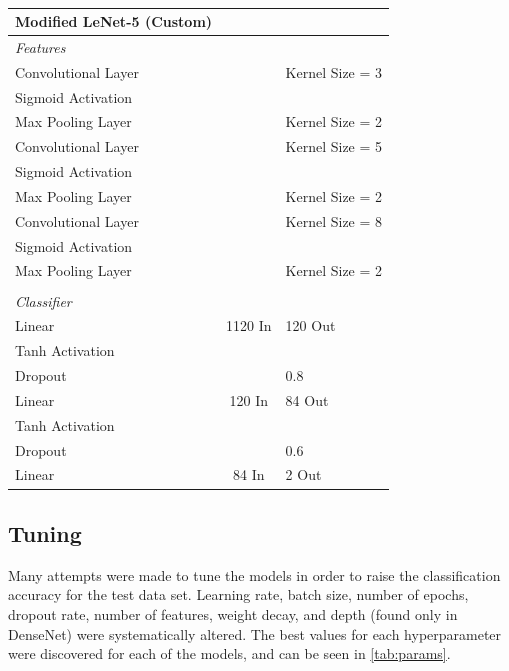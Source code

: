 \documentclass[manuscript,screen,review]{acmart}
\begin{document}
\begin{table}[h!]
\caption{}
  \label{tab:custom}
  \begin{tabular}{lcl}
    \textbf{Modified LeNet-5 (Custom)} \\
    \toprule
    \textit{Features} \\
    \midrule
    Convolutional Layer &  & Kernel Size = 3 \\
    Sigmoid Activation & & \\
    Max Pooling Layer & & Kernel Size = 2\\
    Convolutional Layer &  & Kernel Size = 5 \\
    Sigmoid Activation & & \\
    Max Pooling Layer & & Kernel Size = 2\\
    Convolutional Layer &  & Kernel Size = 8 \\
    Sigmoid Activation & & \\
    Max Pooling Layer & & Kernel Size = 2\\
     & & \\
    \textit{Classifier} \\
    \midrule
    Linear & 1120 In & 120 Out\\
    Tanh Activation & & \\
    Dropout & & 0.8 \\
    Linear & 120 In & 84 Out\\
    Tanh Activation & & \\
    Dropout & & 0.6 \\
    Linear & 84 In & 2 Out\\
  \bottomrule
\end{tabular}
\end{table}


\subsection{Tuning}

Many attempts were made to tune the models in order to raise the classification accuracy for the test data set. Learning rate, batch size, number of epochs, dropout rate, number of features, weight decay, and depth (found only in DenseNet) were systematically altered. The best values for each hyperparameter were discovered for each of the models, and can be seen in \cref{tab:params}.
\end{document}
